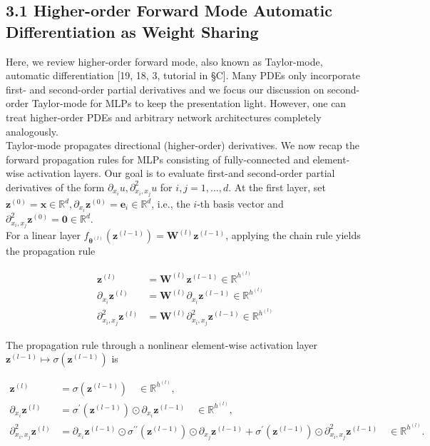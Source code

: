 \documentclass[10pt]{article}
\begin{document}
\subsection*{3.1 Higher-order Forward Mode Automatic Differentiation as Weight Sharing}
Here, we review higher-order forward mode, also known as Taylor-mode, automatic differentiation [19, 18, 3, tutorial in §C]. Many PDEs only incorporate first- and second-order partial derivatives and we focus our discussion on second-order Taylor-mode for MLPs to keep the presentation light. However, one can treat higher-order PDEs and arbitrary network architectures completely analogously.\\
Taylor-mode propagates directional (higher-order) derivatives. We now recap the forward propagation rules for MLPs consisting of fully-connected and element-wise activation layers. Our goal is to evaluate first-and second-order partial derivatives of the form $\partial_{x_{i}} u, \partial_{x_{i}, x_{j}}^{2} u$ for $i, j=1, \ldots, d$. At the first layer, set $\boldsymbol{z}^{(0)}=\boldsymbol{x} \in \mathbb{R}^{d}, \partial_{x_{i}} \boldsymbol{z}^{(0)}=\boldsymbol{e}_{i} \in \mathbb{R}^{d}$, i.e., the $i$-th basis vector and $\partial_{x_{i}, x_{j}}^{2} \boldsymbol{z}^{(0)}=\mathbf{0} \in \mathbb{R}^{d}$.\\
For a linear layer $f_{\boldsymbol{\theta}^{(l)}}\left(\boldsymbol{z}^{(l-1)}\right)=\boldsymbol{W}^{(l)} \boldsymbol{z}^{(l-1)}$, applying the chain rule yields the propagation rule


\begin{align*}
\boldsymbol{z}^{(l)} & =\boldsymbol{W}^{(l)} \boldsymbol{z}^{(l-1)} \in \mathbb{R}^{h^{(l)}}  \tag{5a}\\
\partial_{x_{i}} \boldsymbol{z}^{(l)} & =\boldsymbol{W}^{(l)} \partial_{x_{i}} \boldsymbol{z}^{(l-1)} \in \mathbb{R}^{h^{(l)}}  \tag{5b}\\
\partial_{x_{i}, x_{j}}^{2} \boldsymbol{z}^{(l)} & =\boldsymbol{W}^{(l)} \partial_{x_{i}, x_{j}}^{2} \boldsymbol{z}^{(l-1)} \in \mathbb{R}^{h^{(l)}} \tag{5c}
\end{align*}


The propagation rule through a nonlinear element-wise activation layer $\boldsymbol{z}^{(l-1)} \mapsto \sigma\left(\boldsymbol{z}^{(l-1)}\right)$ is


\begin{align*}
\boldsymbol{z}^{(l)} & =\sigma\left(\boldsymbol{z}^{(l-1)}\right) \quad \in \mathbb{R}^{h^{(l)}},  \tag{6a}\\
\partial_{x_{i}} \boldsymbol{z}^{(l)} & =\sigma^{\prime}\left(\boldsymbol{z}^{(l-1)}\right) \odot \partial_{x_{i}} \boldsymbol{z}^{(l-1)} \quad \in \mathbb{R}^{h^{(l)}},  \tag{6b}\\
\partial_{x_{i}, x_{j}}^{2} \boldsymbol{z}^{(l)} & =\partial_{x_{i}} \boldsymbol{z}^{(l-1)} \odot \sigma^{\prime \prime}\left(\boldsymbol{z}^{(l-1)}\right) \odot \partial_{x_{j}} \boldsymbol{z}^{(l-1)}+\sigma^{\prime}\left(\boldsymbol{z}^{(l-1)}\right) \odot \partial_{x_{i}, x_{j}}^{2} \boldsymbol{z}^{(l-1)} \quad \in \mathbb{R}^{h^{(l)}} . \tag{6c}
\end{align*}
\end{document}
